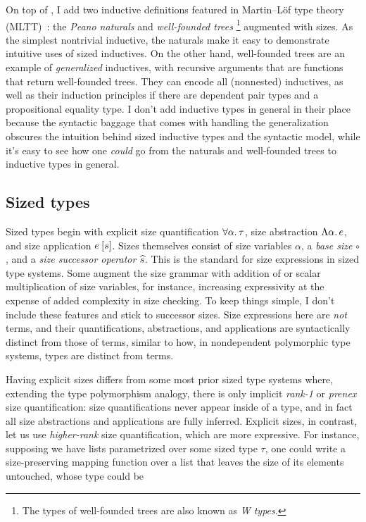 On top of \GCC, I add two inductive definitions featured in Martin--L\"of type theory (MLTT)~\citep{MLTT}:
the \emph{Peano naturals} and \emph{well-founded trees}\punctstack{,}%
\footnote{The types of well-founded trees are also known as \emph{W types}.}
augmented with sizes.
As the simplest nontrivial inductive,
the naturals make it easy to demonstrate intuitive uses of sized inductives.
On the other hand, well-founded trees are an example of \emph{generalized} inductives,
with recursive arguments that are functions that return well-founded trees.
They can encode all (nonnested) inductives,
as well as their induction principles \citep{whynotW} if there are dependent pair types
and a propositional equality type.
I don't add inductive types in general in their place
because the syntactic baggage that comes with handling the generalization
obscures the intuition behind sized inductive types and the syntactic model,
while it's easy to see how one \emph{could} go from the naturals and well-founded trees
to inductive types in general.

\subsection{Sized types}\label{sec:sized-types}

Sized types begin with explicit size quantification $\forall \alpha \mathpunct{.} \tau$,
size abstraction $\Lambda \alpha \mathpunct{.} e$, and size application $\App{e}{s}$.
Sizes themselves consist of size variables $\alpha$, a \emph{base size} $\circ$,
and a \emph{size successor operator} $\widehat{s}$.
This is the standard for size expressions in sized type systems.
Some augment the size grammar with addition of or scalar multiplication of size variables,
for instance, increasing expressivity at the expense of added complexity in size checking.
To keep things simple, I don't include these features and stick to successor sizes.
Size expressions here are \emph{not} terms,
and their quantifications, abstractions, and applications
are syntactically distinct from those of terms,
similar to how, in nondependent polymorphic type systems,
types are distinct from terms.

Having explicit sizes differs from some most prior sized type systems where,
extending the type polymorphism analogy,
there is only implicit \emph{rank-1} or
\emph{prenex} size quantification:
size quantifications never appear inside of a type,
and in fact all size abstractions and applications are fully inferred.
Explicit sizes, in contrast, let us use
\emph{higher-rank} size quantification,
which are more expressive.
For instance, supposing we have lists parametrized over some sized type $\tau$,
one could write a size-preserving mapping function over a list
that leaves the size of its elements untouched, whose type could be

